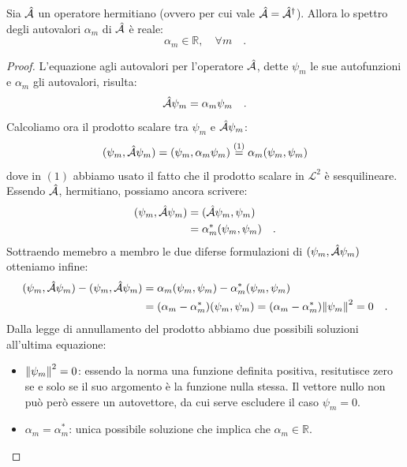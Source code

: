 \begin{teorema}
    Sia $\hat{\mathcal{A}}$ un operatore hermitiano (ovvero per cui vale $\hat{\mathcal{A}} = \hat{\mathcal{A}}^\dagger$). Allora lo spettro degli autovalori $\alpha_m$ di $\hat{\mathcal{A}}$ è reale: 
    \[
        \alpha_m \in \mathbb{R}, \quad \forall m \quad.
    \]
\end{teorema}
\begin{proof}
    L'equazione agli autovalori per l'operatore $\hat{\mathcal{A}}$, dette $\psi_m$ le sue autofunzioni e $\alpha_m$ gli autovalori, risulta:
    \[
        \hat{\mathcal{A}}\psi_m = \alpha_m \psi_m \quad.
    \]
    Calcoliamo ora il prodotto scalare tra $\psi_m$ e $\hat{\mathcal{A}}\psi_m$:
    \[
        (\psi_m, \hat{\mathcal{A}}\psi_m) = (\psi_m, \alpha_m\psi_m) \overset{(1)}{=} \alpha_m(\psi_m,\psi_m)
    \]
    dove in $(1)$ abbiamo usato il fatto che il prodotto scalare in $\mathcal{L}^2$ è sesquilineare. Essendo $\hat{\mathcal{A}}$, hermitiano, possiamo ancora scrivere:
    \[
    \begin{aligned}
        (\psi_m, \hat{\mathcal{A}}\psi_m) &= (\hat{\mathcal{A}}\psi_m, \psi_m) \\
        &= \alpha_m^*(\psi_m, \psi_m) \quad.
    \end{aligned}
    \]
    Sottraendo memebro a membro le due diferse formulazioni di $(\psi_m, \hat{\mathcal{A}}\psi_m)$ otteniamo infine:
    \[
    \begin{aligned}
        (\psi_m, \hat{\mathcal{A}}\psi_m) - (\psi_m, \hat{\mathcal{A}}\psi_m) &= \alpha_m(\psi_m, \psi_m) - \alpha_m^*(\psi_m, \psi_m) \\ &= (\alpha_m -\alpha_m^*)(\psi_m, \psi_m) =(\alpha_m -\alpha_m^*) \norm{\psi_m}^2 = 0 \quad.
    \end{aligned}
    \]
    Dalla legge di annullamento del prodotto abbiamo due possibili soluzioni all'ultima equazione:
    \begin{itemize}
        \item $\norm{\psi_m}^2 = 0$: essendo la norma una funzione definita positiva, resitutisce zero se e solo se il suo argomento è la funzione nulla stessa. Il vettore nullo non può però essere un autovettore, da cui serve escludere il caso $\psi_m = 0$. 
        \item $\alpha_m = \alpha_m^*$: unica possibile soluzione che implica che $\alpha_m \in \mathbb{R}$.
    \end{itemize} 
\end{proof}

